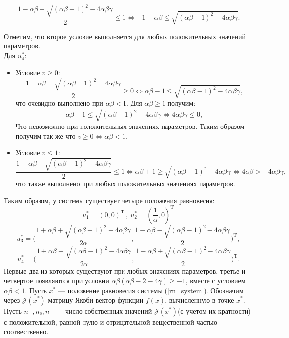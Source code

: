 \documentclass[10pt]{article}
\numberwithin{equation}{section}
\begin{document}
\begin{enumerate}
\begin{itemize}
	\[ \frac{1 - \alpha \beta - \sqrt{(\alpha \beta - 1)^2 - 4\alpha \beta \gamma}}{2} \leq 1 \iff -1 - \alpha \beta \leq \sqrt{(\alpha \beta - 1)^2 - 4 \alpha \beta \gamma}. \]
\end{itemize}
Отметим, что второе условие выполняется для любых положительных значений параметров.\\
Для \( u_4^* \):
\begin{itemize}
	\item Условие \( v \geq 0 \):
	\[ \frac{1 - \alpha \beta - \sqrt{(\alpha \beta - 1)^2 - 4\alpha \beta \gamma}}{2} \geq 0 \iff \alpha \beta - 1 \leq \sqrt{(\alpha \beta - 1)^2 - 4 \alpha \beta \gamma}, \]
	что очевидно выполнено при \( \alpha \beta < 1 \). Для \( \alpha \beta \geq 1 \) получим:
	\[ \alpha \beta - 1 \leq \sqrt{(\alpha \beta - 1)^2 - 4 \alpha \beta \gamma} \iff 4 \alpha \beta \gamma \leq 0, \]
	Что невозможно при положительных значениях параметров. Таким образом получим так же что \( v \geq 0 \iff \alpha \beta < 1 \). 
	\item Условие \( v \leq 1 \):
	\[ \frac{1 - \alpha \beta + \sqrt{(\alpha \beta - 1)^2 + 4\alpha \beta \gamma}}{2} \leq 1 \iff \alpha \beta + 1 \geq \sqrt{(\alpha \beta - 1)^2 - 4 \alpha \beta \gamma} \iff 4 \alpha \beta > -4 \alpha \beta \gamma, \]
	что также выполнено при любых положительных значениях параметров.
\end{itemize}
\end{enumerate} 
Таким образом, у системы существует четыре положения равновесия:
\[ u_1^* = (0, 0)^{\mathrm{T}} \ , \ u_2^* = (\frac{1}{\alpha}, 0)^{\mathrm{T}} \]
\[ u_3^* =  \Big( \frac{1 + \alpha \beta + \sqrt{(\alpha \beta - 1)^2 - 4 \alpha \beta \gamma}}{2\alpha},  \frac{1 - \alpha \beta - \sqrt{(\alpha \beta - 1)^2 - 4 \alpha \beta \gamma}}{2} \Big)^{\mathrm{T}}, \]
\[ u_4^* =  \Big( \frac{1 + \alpha \beta - \sqrt{(\alpha \beta - 1)^2 - 4 \alpha \beta \gamma}}{2\alpha},  \frac{1 - \alpha \beta + \sqrt{(\alpha \beta - 1)^2 - 4 \alpha \beta \gamma}}{2} \Big)^{\mathrm{T}}. \]
Первые два из которых существуют при любых значениях параметров, третье и четвертое появляются при условии \( \alpha \beta ( \alpha \beta - 2 - 4 \gamma) \ge -1 \), вместе с условием \( \alpha \beta < 1 \).
Пусть \( x^* \) --- положение равновесия системы (\ref{rn_system}). Обозначим через \( \mathcal{J}(x^*) \) матрицу Якоби вектор-функции \( f(x) \), вычисленную в точке \( x^* \). Пусть \( n_{+}, n_0, n_{-} \) --- число собственных значений \( \mathcal{J}(x^*) \)(с учетом их кратности) с положительной, равной нулю и отрицательной вещественной частью соотвественно.
\end{document}

